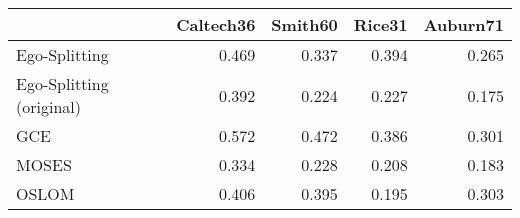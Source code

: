 \begin{tabular}{lrrrr}
\toprule
{} & Caltech36 & Smith60 & Rice31 & Auburn71 \\
\midrule
Ego-Splitting            &     0.469 &   0.337 &  0.394 &    0.265 \\
Ego-Splitting (original) &     0.392 &   0.224 &  0.227 &    0.175 \\
GCE                      &     0.572 &   0.472 &  0.386 &    0.301 \\
MOSES                    &     0.334 &   0.228 &  0.208 &    0.183 \\
OSLOM                    &     0.406 &   0.395 &  0.195 &    0.303 \\
\bottomrule
\end{tabular}
